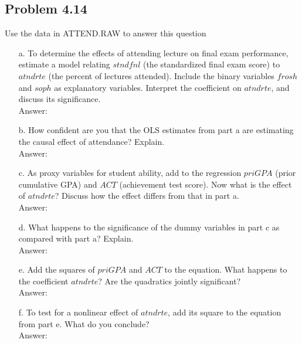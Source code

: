 \documentclass[10pt]{article}
\begin{document}
\subsection*{Problem 4.14}
Use the data in ATTEND.RAW to answer this question
\begin{enumerate}
\item[a.] To determine the effects of attending lecture on final exam performance, estimate a model relating $stndfnl$ (the standardized final exam score) to $atndrte$ (the percent of lectures attended). Include the binary variables $frosh$ and $soph$ as explanatory variables. Interpret the coefficient on $atndrte$, and discuss its significance.
\\ Answer:\\

\item[b.] How confident are you that the OLS estimates from part a are estimating the causal effect of attendance? Explain.
\\ Answer:\\

\item[c.] As proxy variables for student ability, add to the regression $priGPA$ (prior cumulative GPA) and $ACT$ (achievement test score). Now what is the effect of $atndrte$? Discuss how the effect differs from that in part a.
\\ Answer:\\

\item[d.] What happens to the significance of the dummy variables in part c as compared with part a? Explain.
\\ Answer:\\

\item[e.] Add the squares of $priGPA$ and $ACT$ to the equation. What happens to the coefficient $atndrte$? Are the quadratics jointly significant?
\\ Answer:\\

\item[f.] To test for a nonlinear effect of $atndrte$, add its square to the equation from part e. What do you conclude? 
\\ Answer:\\
\end{enumerate}
\end{document}
